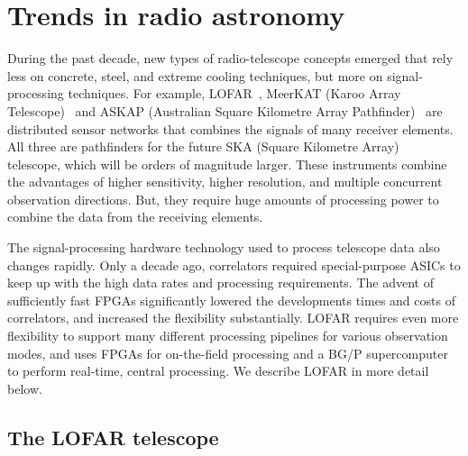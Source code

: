 \documentclass{article}
\begin{document}
\section{Trends in radio astronomy}

During the past decade, new types of radio-telescope concepts emerged that
rely less on concrete, steel, and extreme cooling techniques, but more on
signal-processing techniques.
For example, LOFAR~\cite{deVos:09}, MeerKAT (Karoo Array Telescope)~\cite{meerkat} and
ASKAP (Australian Square Kilometre Array Pathfinder)~\cite{askap}
are distributed sensor networks
that combines the signals of many receiver elements.
All three are pathfinders for the future SKA (Square Kilometre Array)~\cite{ska} telescope, which
will be orders of magnitude larger.
These
instruments combine the advantages of higher sensitivity, higher resolution,
and multiple concurrent observation directions.
But, they require huge
amounts of processing power to combine the data from the receiving elements.

The signal-processing hardware technology used to process telescope
data also changes rapidly.  Only a decade ago, correlators required
special-purpose ASICs to keep up with the high data rates and
processing requirements.  The advent of sufficiently fast FPGAs
significantly lowered the developments times and costs of
correlators, and increased the flexibility
substantially. LOFAR requires even more flexibility to support many
different processing pipelines for various observation modes, and uses
FPGAs for on-the-field processing and a BG/P
supercomputer to perform real-time, central processing.
We describe LOFAR in more detail below.



\subsection{The LOFAR telescope}
\end{document}
